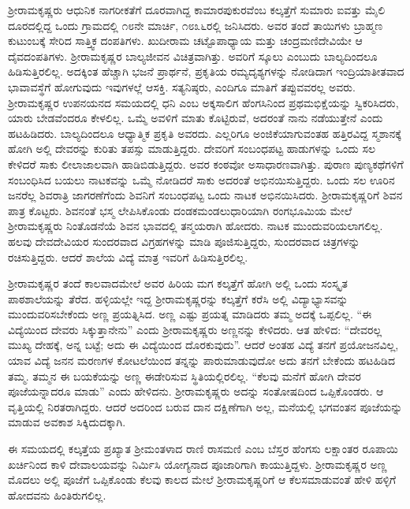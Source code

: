 \vskip 2pt

ಶ‍್ರೀರಾಮಕೃಷ್ಣರು ಆಧುನಿಕ ನಾಗರೀಕತೆಗೆ ದೂರವಾಗಿದ್ದ ಕಾಮಾರಪುಕುರವೆಂಬ ಕಲ್ಕತ್ತೆಗೆ ಸುಮಾರು ಐವತ್ತು ಮೈಲಿ ದೂರದಲ್ಲಿದ್ದ ಒಂದು ಗ್ರಾಮದಲ್ಲಿ ೧೮ನೇ ಮಾರ್ಚಿ, ೧೮೩೬ರಲ್ಲಿ ಜನಿಸಿದರು. ಅವರ ತಂದೆ ತಾಯಿಗಳು ಬ್ರಾಹ್ಮಣ ಕುಟುಂಬಕ್ಕೆ ಸೇರಿದ ಸಾತ್ತ್ವಿಕ ದಂಪತಿಗಳು. ಖುದೀರಾಮ ಚಟ್ಟೊಪಾಧ್ಯಾಯ ಮತ್ತು ಚಂದ್ರಮಣಿದೇವಿಯೇ ಆ ದೈವದಂಪತಿಗಳು. ಶ‍್ರೀರಾಮಕೃಷ್ಣರ ಬಾಲ್ಯಜೀವನ ವಿಚಿತ್ರವಾಗಿತ್ತು. ಅವರಿಗೆ ಸ್ಕೂಲು ಎಂಬುದು ಬಾಲ್ಯದಿಂದಲೂ ಹಿಡಿಸುತ್ತಿರಲಿಲ್ಲ. ಅದಕ್ಕಿಂತ ಹೆಚ್ಚಾಗಿ ಭಜನೆ ಪ್ರಾರ್ಥನೆ, ಪ್ರಕೃತಿಯ ರಮ್ಯದೃಶ್ಯಗಳನ್ನು ನೋಡಿದಾಗ ಇಂದ್ರಿಯಾತೀತವಾದ ಭಾವಾವಸ್ಥೆಗೆ ಹೋಗುವುದು ಇವುಗಳಲ್ಲೆ ಆಸಕ್ತಿ. ಸತ್ಯನಿಷ್ಠರು, ಎಂದಿಗೂ ಮಾತಿಗೆ ತಪ್ಪುವವರಲ್ಲ ಅವರು. ಶ‍್ರೀರಾಮಕೃಷ್ಣರ ಉಪನಯನದ ಸಮಯದಲ್ಲಿ ಧನಿ ಎಂಬ ಅಕ್ಕಸಾಲಿಗ ಹೆಂಗಸಿನಿಂದ ಪ್ರಥಮಭಿಕ್ಷೆಯನ್ನು ಸ್ವಿಕರಿಸಿದರು, ಯಾರು ಬೇಡವೆಂದರೂ ಕೇಳಲಿಲ್ಲ. ಒಮ್ಮೆ ಅವಳಿಗೆ ಮಾತು ಕೊಟ್ಟಿರುವೆ, ಅದರಂತೆ ನಾನು ನಡೆಯುತ್ತೇನೆ ಎಂದು ಹಟಹಿಡಿದರು. ಬಾಲ್ಯದಿಂದಲೂ ಆಧ್ಯಾತ್ಮಿಕ ಪ್ರಕೃತಿ ಅವರದು. ಎಲ್ಲರಿಗೂ ಅಂಜಿಕೆಯಾಗುವಂತಹ ಹತ್ತಿರವಿದ್ದ ಸ್ಮಶಾನಕ್ಕೆ ಹೋಗಿ ಅಲ್ಲಿ ದೇವರನ್ನು ಕುರಿತು ತಪಸ್ಸು ಮಾಡುತ್ತಿದ್ದರು. ದೇವರಿಗೆ ಸಂಬಂಧಪಟ್ಟ ಹಾಡುಗಳನ್ನು ಒಂದು ಸಲ ಕೇಳಿದರೆ ಸಾಕು ಲೀಲಾಜಾಲವಾಗಿ ಹಾಡಿಬಿಡುತ್ತಿದ್ದರು. ಅವರ ಕಂಠವೋ ಅಸಾಧಾರಣವಾಗಿತ್ತು. ಪುರಾಣ ಪುಣ್ಯಕಥೆಗಳಿಗೆ ಸಂಬಂಧಿಸಿದ ಬಯಲು ನಾಟಕವನ್ನು ಒಮ್ಮೆ ನೋಡಿದರೆ ಸಾಕು ಅದರಂತೆ ಅಭಿನಯಿಸುತ್ತಿದ್ದರು. ಒಂದು ಸಲ ಊರಿನ ಜನರೆಲ್ಲ ಶಿವರಾತ್ರಿ ಜಾಗರಣೆಗೆಂದು ಶಿವನಿಗೆ ಸಂಬಂಧಪಟ್ಟ ಒಂದು ನಾಟಕ ಅಭಿನಯಿಸಿದರು. ಶ‍್ರೀರಾಮಕೃಷ್ಣರಿಗೆ ಶಿವನ ಪಾತ್ರ ಕೊಟ್ಟರು. ಶಿವನಂತೆ ಭಸ್ಮ ಲೇಪಿಸಿಕೊಂಡು ದಂಡಕಮಂಡಲುಧಾರಿಯಾಗಿ ರಂಗಭೂಮಿಯ ಮೇಲೆ ಶ‍್ರೀರಾಮಕೃಷ್ಣರು ನಿಂತೊಡನೆಯೆ ಶಿವನ ಭಾವದಲ್ಲಿ ತನ್ಮಯರಾಗಿ ಹೋದರು. ನಾಟಕ ಮುಂದುವರಿಯಲಾಗಲಿಲ್ಲ. ಹಲವು ದೇವದೇವಿಯರ ಸುಂದರವಾದ ವಿಗ್ರಹಗಳನ್ನು ಮಾಡಿ ಪೂಜಿಸುತ್ತಿದ್ದರು, ಸುಂದರವಾದ ಚಿತ್ರಗಳನ್ನು ರಚಿಸುತ್ತಿದ್ದರು. ಆದರೆ ಶಾಲೆಯ ವಿದ್ಯೆ ಮಾತ್ರ ಇವರಿಗೆ ಹಿಡಿಸುತ್ತಿರಲಿಲ್ಲ.

ಶ‍್ರೀರಾಮಕೃಷ್ಣರ ತಂದೆ ಕಾಲವಾದಮೇಲೆ ಅವರ ಹಿರಿಯ ಮಗ ಕಲ್ಕತ್ತೆಗೆ ಹೋಗಿ ಅಲ್ಲಿ ಒಂದು ಸಂಸ್ಕೃತ ಪಾಠಶಾಲೆಯನ್ನು ತೆರೆದ. ಹಳ್ಳಿಯಲ್ಲೇ ಇದ್ದ ಶ‍್ರೀರಾಮಕೃಷ್ಣರನ್ನು ಕಲ್ಕತ್ತೆಗೆ ಕರೆಸಿ ಅಲ್ಲಿ ವಿದ್ಯಾಭ್ಯಾಸವನ್ನು ಮುಂದುವರಿಸಬೇಕೆಂದು ಅಣ್ಣ ಪ್ರಯತ್ನಿಸಿದ. ಅಣ್ಣ ಎಷ್ಟು ಪ್ರಯತ್ನ ಮಾಡಿದರು ತಮ್ಮ ಅದಕ್ಕೆ ಒಪ್ಪಲಿಲ್ಲ. “ಈ ವಿದ್ಯೆಯಿಂದ ದೇವರು ಸಿಕ್ಕುತ್ತಾನೇನು” ಎಂದು ಶ‍್ರೀರಾಮಕೃಷ್ಣರು ಅಣ್ಣನನ್ನು ಕೇಳಿದರು. ಆತ ಹೇಳಿದ: “ದೇವರಲ್ಲ ಮುಖ್ಯ ದೇಹಕ್ಕೆ, ಅನ್ನ ಬಟ್ಟೆ; ಅದು ಈ ವಿದ್ಯೆಯಿಂದ ದೊರಕುವುದು”. ಆದರೆ ಅಂತಹ ವಿದ್ಯೆ ತನಗೆ ಪ್ರಯೋಜನವಿಲ್ಲ, ಯಾವ ವಿದ್ಯೆ ಜನನ ಮರಣಗಳ ಕೋಟಲೆಯಿಂದ ತನ್ನನ್ನು ಪಾರುಮಾಡುವುದೋ ಅದು ತನಗೆ ಬೇಕೆಂದು ಹಟಹಿಡಿದ ತಮ್ಮ. ತಮ್ಮನ ಈ ಬಯಕೆಯನ್ನು ಅಣ್ಣ ಈಡೇರಿಸುವ ಸ್ಥಿತಿಯಲ್ಲಿರಲಿಲ್ಲ. “ಕೆಲವು ಮನೆಗೆ ಹೋಗಿ ದೇವರ ಪೂಜೆಯನ್ನಾದರೂ ಮಾಡು” ಎಂದು ಹೇಳಿದನು. ಶ‍್ರೀರಾಮಕೃಷ್ಣರು ಅದನ್ನು ಸಂತೋಷದಿಂದ ಒಪ್ಪಿಕೊಂಡರು. ಆ ವೃತ್ತಿಯಲ್ಲಿ ನಿರತರಾಗಿದ್ದರು. ಆದರೆ ಅದರಿಂದ ಬರುವ ದಾನ ದಕ್ಷಿಣೆಗಾಗಿ ಅಲ್ಲ, ಮನೆಯಲ್ಲಿ ಭಗವಂತನ ಪೂಜೆಯನ್ನು ಮಾಡುವ ಅವಕಾಶ ಸಿಕ್ಕಿದುದಕ್ಕಾಗಿ.

ಈ ಸಮಯದಲ್ಲಿ ಕಲ್ಕತ್ತೆಯ ಪ್ರಖ್ಯಾತ ಶ‍್ರೀಮಂತಳಾದ ರಾಣಿ ರಾಸಮಣಿ ಎಂಬ ಬೆಸ್ತರ ಹೆಂಗಸು ಲಕ್ಷಾಂತರ ರೂಪಾಯಿ ಖರ್ಚಿನಿಂದ ಕಾಳಿ ದೇವಾಲಯವನ್ನು ನಿರ್ಮಿಸಿ ಯೋಗ್ಯನಾದ ಪೂಜಾರಿಗಾಗಿ ಕಾಯುತ್ತಿದ್ದಳು. ಶ‍್ರೀರಾಮಕೃಷ್ಣರ ಅಣ್ಣ ಮೊದಲು ಅಲ್ಲಿ ಪೂಜೆಗೆ ಒಪ್ಪಿಕೊಂಡು ಕೆಲವು ಕಾಲದ ಮೇಲೆ ಶ‍್ರೀರಾಮಕೃಷ್ಣರಿಗೆ ಆ ಕೆಲಸಮಾಡುವಂತೆ ಹೇಳಿ ಹಳ್ಳಿಗೆ ಹೋದವನು ಹಿಂತಿರುಗಲಿಲ್ಲ.

